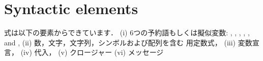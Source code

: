 \documentclass[a4paper,10pt,twoside]{book}
\begin{document}
\section{Syntactic elements}

式は以下の要素からできています．
(i) 6つの予約語もしくは擬似変数:
, , , , , and ,
(ii) 数，文字，文字列，シンボルおよび配列を含む 用定数式，
(iii) 変数宣言，
(iv) 代入，
(v)  クロージャー
(vi) メッセージ
\end{document}
